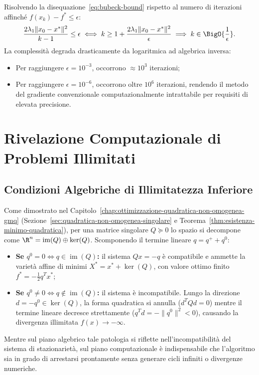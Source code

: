 Risolvendo la disequazione~\eqref{eq:bubeck-bound} rispetto al numero di iterazioni affinch\'e $f(x_k) - f^* \le \epsilon$:
\begin{equation}
    \frac{2 \lambda_1 \|x_0 - x^*\|^2}{k - 1} \le \epsilon \iff k \ge 1 + \frac{2 \lambda_1 \|x_0 - x^*\|^2}{\epsilon} \implies k \in \BigO{\frac{1}{\epsilon}}.
\end{equation}
La complessit\`a degrada drasticamente da logaritmica ad algebrica inversa:
\begin{itemize}
    \item Per raggiungere $\epsilon = 10^{-3}$, occorrono $\approx 10^3$ iterazioni;
    \item Per raggiungere $\epsilon = 10^{-6}$, occorrono oltre $10^6$ iterazioni, rendendo il metodo del gradiente convenzionale computazionalmente intrattabile per requisiti di elevata precisione.
\end{itemize}

\FloatBarrier
\section{Rivelazione Computazionale di Problemi Illimitati}
\label{sec:rivelazione-problemi-illimitati}

\subsection{Condizioni Algebriche di Illimitatezza Inferiore}
Come dimostrato nel Capitolo~\ref{chap:ottimizzazione-quadratica-non-omogenea-gmq} (Sezione~\ref{sec:quadratica-non-omogenea-singolare} e Teorema~\ref{thm:esistenza-minimo-quadratica}), per una matrice singolare $Q \succeq 0$ lo spazio si decompone come $\R^n = \operatorname{im}(Q) \oplus \ker(Q)$. Scomponendo il termine lineare $q = q^+ + q^0$:
\begin{itemize}
    \item \textbf{Se $q^0 = 0 \iff q \in \operatorname{im}(Q)$:} il sistema $Q x = -q$ \`e compatibile e ammette la variet\`a affine di minimi $X^* = x^* + \ker(Q)$, con valore ottimo finito $f^* = -\frac{1}{2} q^T x^*$;
    \item \textbf{Se $q^0 \neq 0 \iff q \notin \operatorname{im}(Q)$:} il sistema \`e incompatibile. Lungo la direzione $d = -q^0 \in \ker(Q)$, la forma quadratica si annulla ($d^T Q d = 0$) mentre il termine lineare decresce strettamente ($q^T d = -\|q^0\|^2 < 0$), causando la divergenza illimitata $f(x) \to -\infty$.
\end{itemize}
Mentre sul piano algebrico tale patologia si riflette nell'incompatibilit\`a del sistema di stazionariet\`a, sul piano computazionale \`e indispensabile che l'algoritmo sia in grado di arrestarsi prontamente senza generare cicli infiniti o divergenze numeriche.

